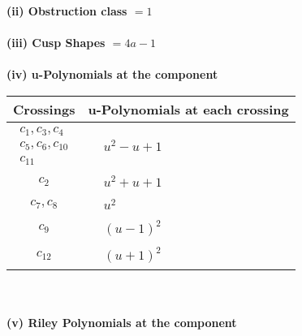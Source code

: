 \documentclass[1p]{elsarticle_modified}
\theoremstyle{definition}
\begin{document}
\flushleft \textbf{(ii) Obstruction class $= 1$}\\~\\
\flushleft \textbf{(iii) Cusp Shapes $= 4 a-1$}\\~\\
\newpage\renewcommand{\arraystretch}{1}
\flushleft \textbf{(iv) u-Polynomials at the component}\newline \\
\begin{tabular}{m{50pt}|m{274pt}}
Crossings & \hspace{64pt}u-Polynomials at each crossing \\
\hline $$\begin{aligned}c_{1},c_{3},c_{4}\\c_{5},c_{6},c_{10}\\c_{11}\end{aligned}$$&$\begin{aligned}
&u^2- u+1
\end{aligned}$\\
\hline $$\begin{aligned}c_{2}\end{aligned}$$&$\begin{aligned}
&u^2+u+1
\end{aligned}$\\
\hline $$\begin{aligned}c_{7},c_{8}\end{aligned}$$&$\begin{aligned}
&u^2
\end{aligned}$\\
\hline $$\begin{aligned}c_{9}\end{aligned}$$&$\begin{aligned}
&(u-1)^2
\end{aligned}$\\
\hline $$\begin{aligned}c_{12}\end{aligned}$$&$\begin{aligned}
&(u+1)^2
\end{aligned}$\\
\hline
\end{tabular}\\~\\
\newpage\renewcommand{\arraystretch}{1}
\flushleft \textbf{(v) Riley Polynomials at the component}\newline \\
\end{document}
